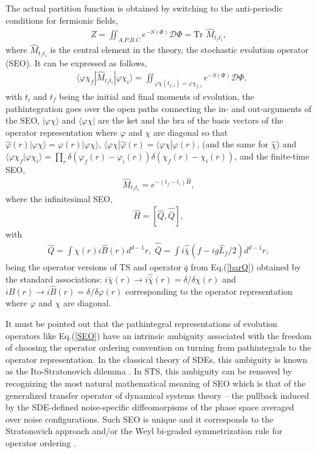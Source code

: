 \documentclass[final,5p,10pt,times,twocolumn,year]{elsarticle}
\begin{document}
The actual partition function is obtained by switching to the anti-periodic conditions for fermionic fields,
\begin{eqnarray}
    Z = \iint_{A.P.B.C} e^{-S(\Phi)} \mathcal{D}\Phi = \text{Tr }\hat M_{t_ft_i},\label{partitionFunction}
\end{eqnarray}
where $\hat M_{t_ft_i}$ is the central element in the theory, the stochastic evolution operator (SEO). It can be expressed as follows,
\begin{eqnarray}
    &\langle \varphi\chi_f|\hat M_{t_ft_i} | \varphi\chi_i \rangle =  \iint_{\varphi\chi(t_{f,i}) =\varphi\chi_{f,i} }e^{-S(\Phi)} {\mathcal D}\Phi,\label{SEO} 
\end{eqnarray}
with $t_i$ and $t_f$ being the initial and final moments of evolution, the pathintegration goes over the open paths connecting the in- and out-arguments of the SEO, $|\varphi\chi\rangle$ and $\langle \varphi\chi|$ are the ket and the bra of the basis vectors of the operator representation where $\varphi$ and $\chi$ are diagonal so that $\hat \varphi(r)|\varphi\chi\rangle=\varphi(r)|\varphi\chi\rangle$, $\langle \varphi\chi|\hat \varphi(r)=\langle \varphi\chi| \varphi(r)$, (and the same for $\hat\chi$) and $\langle \varphi\chi_f|\varphi\chi_i \rangle = \prod_r\delta(\varphi_f(r)-\varphi_i(r))\delta(\chi_f(r)-\chi_i(r)) $, and the finite-time SEO,
\begin{eqnarray}
   \hat M_{t_ft_i} = e^{- (t_f-t_i)\hat H},
\end{eqnarray}
where the infinitesimal SEO,
\begin{eqnarray}
    \hat H = [\hat Q, \hat{\bar Q}],\label{SEOOper}
\end{eqnarray}
with
\begin{eqnarray}
    \hat Q = \int \chi(r) i\hat B(r) d^{d-1}r, \; \hat{\bar Q} = \int i\hat{\bar\chi} \left( f - i g \hat L_{f}/2 \right) d^{d-1} r,\label{Suerpcharges}
\end{eqnarray} being the operator versions of TS and operator $\bar q$ from Eq.(\ref{barQ}) obtained by the standard associations: $i\bar\chi(r) \to i\hat{\bar\chi}(r)=\delta/\delta\chi(r)$ and $iB(r)\to i\hat B(r)=\delta/\delta\varphi(r)$ corresponding to the operator representation where $\varphi$ and $\chi$ are diagonal.

It must be pointed out that the pathintegral representations of evolution operators like Eq.(\ref{SEO}) have an intrinsic ambiguity associated with the freedom of choosing the operator ordering convention on turning from pathintegrals to the operator representation. In the classical theory of SDEs, this ambiguity is known as the Ito-Stratonovich dilemma \cite{West}. In STS, this ambiguity can be removed by recognizing the most natural mathematical meaning of SEO which is that of the generalized transfer operator of dynamical systems theory \cite{Rue02} -- the pullback induced by the SDE-defined noise-specific diffeomorpisms of the phase space averaged over noise configurations. Such SEO is unique and it corresponds to the Stratonovich approach and/or the Weyl bi-graded symmetrization rule for operator ordering \cite{OvcEntropy}.
\end{document}
